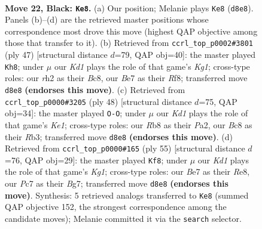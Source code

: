 \documentclass[11pt]{article}
\begin{document}
\clearpage

\begin{figure}[p]\centering
\begin{subfigure}{0.46\textwidth}\centering
\resizebox{\linewidth}{!}{%
\newchessgame
\chessboard[
  setfen={1rbk3r/p1p1bp2/2p3p1/P1P4p/1P3P1P/B7/7R/RN2K3 b Q - 0 22},
  showmover=false,
  pgfstyle=straightmove, color=movearrow, markmove={d8-e8}
]}
\caption{}
\end{subfigure}\hfill
\begin{subfigure}{0.46\textwidth}\centering
\resizebox{\linewidth}{!}{%
\newchessgame
\chessboard[
  setfen={1rb2rk1/6pp/p2p3b/3Np3/1PB1p2P/2P5/5PP1/R3K2R b KQ - 1 24},
  showmover=false,
  pgfstyle=straightmove, color=movearrow, markmove={g8-h8}
]}
\caption{}
\end{subfigure}
\\[4pt]
\begin{subfigure}{0.46\textwidth}\centering
\resizebox{\linewidth}{!}{%
\newchessgame
\chessboard[
  setfen={r1r5/4k1p1/2p1p2p/p2n4/P2Pp2P/1R6/P2B1PP1/4K2R w K - 3 25},
  showmover=false,
  pgfstyle=straightmove, color=movearrow, markmove={e1-g1}
]}
\caption{}
\end{subfigure}\hfill
\begin{subfigure}{0.46\textwidth}\centering
\resizebox{\linewidth}{!}{%
\newchessgame
\chessboard[
  setfen={4r1k1/1p4b1/2p3p1/1r3pN1/p2p1P2/3P2P1/PPR1P3/6KR b - - 1 28},
  showmover=false,
  pgfstyle=straightmove, color=movearrow, markmove={g8-f8}
]}
\caption{}
\end{subfigure}
\caption{\textbf{Move 22, Black: \texttt{Ke8}.} (a) Our position; Melanie plays \texttt{Ke8} (\texttt{d8e8}). Panels (b)--(d) are the retrieved master positions whose correspondence most drove this move (highest QAP objective among those that transfer to it). (b) Retrieved from \texttt{ccrl\_top\_p0002\#3801} (ply 47) [structural distance $d$=79, QAP obj=40]: the master played \texttt{Kh8}; under $\mu$ our \emph{Kd1} plays the role of that game's \emph{Kg1}; cross-type roles: our \emph{r}h2 as their \emph{B}c8, our \emph{B}e7 as their \emph{R}f8; transferred move \texttt{d8e8} \textbf{(endorses this move)}. (c) Retrieved from \texttt{ccrl\_top\_p0000\#3205} (ply 48) [structural distance $d$=75, QAP obj=34]: the master played \texttt{O-O}; under $\mu$ our \emph{Kd1} plays the role of that game's \emph{Ke1}; cross-type roles: our \emph{R}b8 as their \emph{P}a2, our \emph{B}c8 as their \emph{R}b3; transferred move \texttt{d8e8} \textbf{(endorses this move)}. (d) Retrieved from \texttt{ccrl\_top\_p0000\#165} (ply 55) [structural distance $d$=76, QAP obj=29]: the master played \texttt{Kf8}; under $\mu$ our \emph{Kd1} plays the role of that game's \emph{Kg1}; cross-type roles: our \emph{B}e7 as their \emph{R}e8, our \emph{P}c7 as their \emph{B}g7; transferred move \texttt{d8e8} \textbf{(endorses this move)}. Synthesis: 5 retrieved analogs transferred to \texttt{Ke8} (summed QAP objective 152, the strongest correspondence among the candidate moves); Melanie committed it via the \texttt{search} selector.}
\label{fig:thought-m43}
\end{figure}
\end{document}
